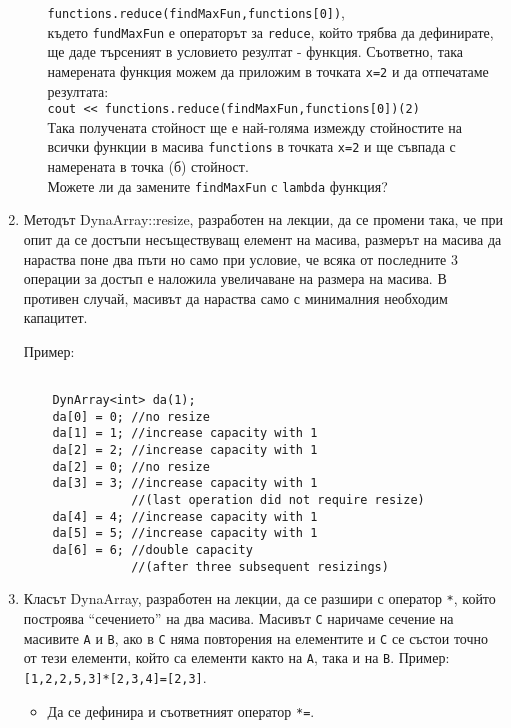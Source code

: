 \documentclass[12pt,a4paper]{article}
\begin{document}
\begin{enumerate}
\begin{enumerate}
\begin{mdframed}[hidealllines=true,backgroundcolor=gray!20]
				\texttt{functions.reduce(findMaxFun,functions[0])},\\

				където \texttt{fundMaxFun} е операторът за \texttt{reduce}, който трябва да дефинирате, ще даде търсеният в условието резултат - функция. Съответно, така намерената функция можем да приложим в точката \texttt{x=2} и да отпечатаме резултата:\\

				\texttt{cout << functions.reduce(findMaxFun,functions[0])(2)}\\

				Така получената стойност ще е най-голяма измежду стойностите на всички функции в масива \texttt{functions} в точката \texttt{x=2} и ще съвпада с намерената в точка (б) стойност.\\

				Можете ли да замените \texttt{findMaxFun} с \texttt{lambda} функция?


		\end{mdframed}

	\end{enumerate}

	\item Методът DynaArray::resize, разработен на лекции, да се промени така, че при опит да се достъпи несъществуващ елемент на масива, размерът на масива да нараства поне два пъти но само при условие, че всяка от последните 3 операции за достъп е наложила увеличаване на размера на масива. В противен случай, масивът да нараства само с минималния необходим капацитет.

	\begin{mdframed}[hidealllines=true,backgroundcolor=gray!20]
	Пример:
	\begin{lstlisting}
		
	DynArray<int> da(1);
	da[0] = 0; //no resize
	da[1] = 1; //increase capacity with 1
	da[2] = 2; //increase capacity with 1
	da[2] = 0; //no resize
	da[3] = 3; //increase capacity with 1 
	           //(last operation did not require resize)
	da[4] = 4; //increase capacity with 1
	da[5] = 5; //increase capacity with 1
	da[6] = 6; //double capacity 
	           //(after three subsequent resizings)

	\end{lstlisting}
	\end{mdframed}

	\item Класът DynaArray, разработен на лекции, да се разшири с оператор \texttt{*}, който построява ``сечението'' на два масива. Масивът \texttt{C} наричаме сечение на масивите \texttt{A} и \texttt{B}, ако в \texttt{C} няма повторения на елементите и \texttt{C} се състои точно от тези елементи, който са елементи както на \texttt{A}, така и на \texttt{B}. Пример: \texttt{[1,2,2,5,3]*[2,3,4]=[2,3]}.
	\begin{itemize}
	\item Да се дефинира и съответният оператор \texttt{*=}.
	\end{itemize}

\end{enumerate}


	\vspace{20px}
\end{document}
